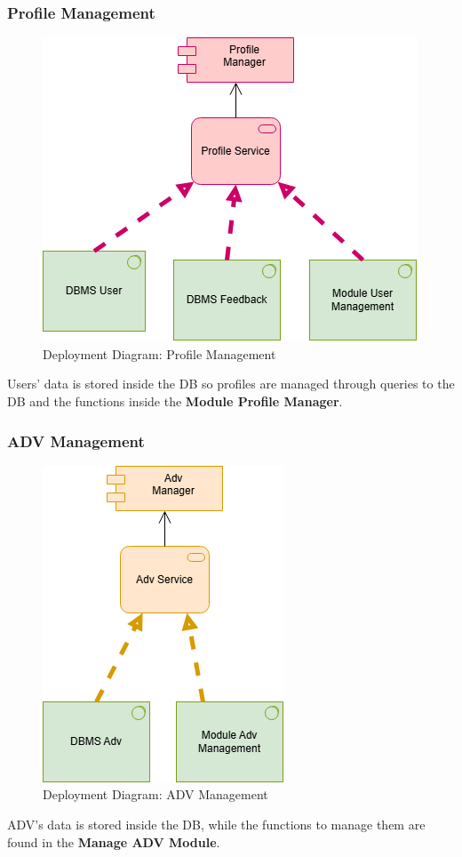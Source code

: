 \subsubsection{Profile Management}
\begin{figure}[H]
    \centering
    \includegraphics[width=0.40\linewidth]{images/architectural design/deployment/depl-profile.drawio.png}
    \caption{Deployment Diagram: Profile Management}
\end{figure}
Users' data is stored inside the DB so profiles are managed through queries to the DB and the functions inside the \textbf{Module Profile Manager}.

\subsubsection{ADV Management}
\begin{figure}[H]
    \centering
    \includegraphics[width=0.25\linewidth]{images/architectural design/deployment/deply-adv.drawio.png}
    \caption{Deployment Diagram: ADV Management}
\end{figure}
ADV's data is stored inside the DB, while the functions to manage them are found in the \textbf{Manage ADV Module}.

